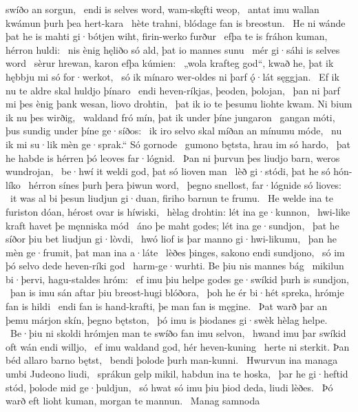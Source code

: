 swíðo an sorgun, \hld\ endi is selves word,
wam-skęfti weop, \hld\ antat imu wallan kwámun
þurh þea hert-kara \hld\ hète trahni,
blódage fan is breostun. \hld\ He ni wánde þat he is mahti gi·bótjen wiht,
firin-werko furður \hld\ efþa te is fráhon kuman,
hérron huldi: \hld\ nis ènig hęliðo só ald,
þat io mannes sunu \hld\ mér gi·sáhi
is selves word \hld\ sèrur hrewan, %
karon efþa kúmien: \hld\ „wola krafteg god“, kwað he,
þat ik hębbju mi só for·werkot, \hld\ só ik mínaro wer-oldes ni þarf
ǫ́·lát sęggjan. \hld\ Ef ik nu te aldre skal
huldjo þínaro \hld\ endi heven-ríkjas,
þeoden, þolojan, \hld\ þan ni þarf mi þes ènig þank wesan,
liovo drohtin, \hld\ þat ik io te þesumu liohte kwam.
Ni bium ik nu þes wirðig, \hld\ waldand fró mín,
þat ik under þíne jungaron \hld\ gangan móti,
þus sundig under þíne ge·síðos: \hld\ ik iro selvo skal
míðan an mínumu móde, \hld\ nu ik mi su·lik mèn ge·sprak.“
Só gornode \hld\ gumono bętsta,
hrau im só hardo, \hld\ þat he habde is hérren þó
leoves far·lógnid. \hld\ Þan ni þurvun þes liudjo barn,
weros wundrojan, \hld\ be·hwí it weldi god,
þat só lioven man \hld\ lèð gi·stódi,
þat he só hón-líko \hld\ hérron sínes
þurh þera þiwun word, \hld\ þegno snellost,
far·lógnide só lioves: \hld\ it was al bi þesun liudjun gi·duan,
firiho barnun te frumu. \hld\ He welde ina te furiston dóan,
hérost ovar is híwiski, \hld\ hèlag drohtin:
lét ina ge·kunnon, \hld\ hwi-like kraft havet
þe męnniska mód \hld\ áno þe maht godes;
lét ina ge·sundjon, \hld\ þat he síðor þiu bet
liudjun gi·lòvdi, \hld\ hwó liof is þar
manno gi·hwi-likumu, \hld\ þan he mèn ge·frumit,
þat man ina a·láte \hld\ lèðes þinges,
sakono endi sundjono, \hld\ só im þó selvo dede
heven-ríki god \hld\ harm-ge·wurhti.
Be þiu nis mannes bág \hld\ mikilun bi·þervi,
hagu-staldes hróm: \hld\ ef imu þiu helpe godes
ge·swíkid þurh is sundjon, \hld\ þan is imu sán aftar þiu
breost-hugi blóðora, \hld\ þoh he ér bi·hét spreka,
hrómje fan is hildi \hld\ endi fan is hand-krafti,
þe man fan is męgine. \hld\ Þat warð þar an þemu márjon skín,
þegno bętston, \hld\ þó imu is þiodanes gi·swèk
hèlag helpe. \hld\ Be·þiu ni skoldi hrómjen man
te swíðo fan imu selvon, \hld\ hwand imu þar swíkid oft
wán endi willjo, \hld\ ef imu waldand god,
hér heven-kuning \hld\ herte ni sterkit.
Þan béd allaro barno bętst, \hld\ bendi þolode
þurh man-kunni. \hld\ Hwurvun ina managa umbi
Judeono liudi, \hld\ sprákun gelp mikil,
habdun ina te hoska, \hld\ þar he gi·heftid stód,
þolode mid ge·þuldjun, \hld\ só hwat só imu þiu þiod deda,
liudi lèðes. \hld\ Þó warð eft lioht kuman,
morgan te mannun. \hld\ Manag samnoda
